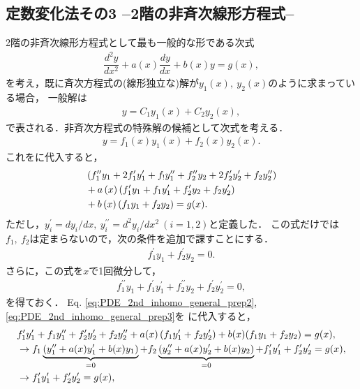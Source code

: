 \subsection{定数変化法その3 –2階の非斉次線形方程式–}
%
2階の非斉次線形方程式として最も一般的な形である次式
\begin{align}
 \dfrac{d^2y}{dx^2} + a(x)\dfrac{dy}{dx} + b(x)y = g(x), \label{eq:PDE_2nd_inhomo_general} 
\end{align}
を考え，既に斉次方程式の(線形独立な)解が$y_1(x),~y_2(x)$のように求まっている場合，
一般解は
\begin{align}
 y = C_1 y_1(x) + C_2 y_2(x), 
\end{align}
で表される．非斉次方程式の特殊解の候補として次式を考える．
\begin{align}
  y = f_1(x) y_1(x) + f_2(x) y_2 (x). 
\end{align}
これをに代入すると，
\begin{align}
   & \left(f_{1}^{\prime\prime}y_{1}+2f_{1}^{\prime}y_{1}^{\prime}+f_{!}y_{1}^{\prime\prime}+f_{2}^{\prime\prime}y_{2}+2f_{2}^{\prime}y_{2}^{\prime}+f_{2}y_{2}^{\prime\prime}\right)\notag\\
 & +a\left(x\right)\left(f_{1}^{\prime}y_{1}+f_{1}y_{1}^{\prime}+f_{2}^{\prime}y_{2}+f_{2}y_{2}^{\prime}\right)\notag\\
 & +b\left(x\right)\left(f_{1}y_{1}+f_{2}y_{2}\right)=g(x). \label{eq:PDE_2nd_inhomo_general_prep1}
\end{align}
ただし，$y^{\prime}_i = dy_i/dx , ~ y^{\prime\prime}_{i} = d^2 y_i/dx^2 ~(i=1,2)$と定義した．
この式だけでは$f_1,~f_2$は定まらないので，次の条件を追加で課すことにする．
\begin{align}
 f_1^\prime y_1 + f_2^\prime y_2 = 0. \label{eq:PDE_2nd_inhomo_general_prep2}
\end{align}
さらに，この式を$x$で1回微分して，
\begin{align}
  f_1^{\prime\prime} y_1 + f_1^{\prime} y_1^{\prime} + f_2^{\prime\prime}y_2 
  + f_2^{\prime} y_2^{\prime} = 0, \label{eq:PDE_2nd_inhomo_general_prep3}
\end{align}
を得ておく．
Eq. \eqref{eq:PDE_2nd_inhomo_general_prep2}, \eqref{eq:PDE_2nd_inhomo_general_prep3}を
に代入すると，
\begin{align}
 &f_1^{\prime} y_1^{\prime} + f_1y_1^{\prime\prime} + f_2^{\prime} y_2^{\prime} + f_2 y_2^{\prime\prime} +a(x)\left(f_1 y_1^{\prime} + f_2 y_2^{\prime}\right) + b(x)(f_1y_1+f_2y_2) = g(x), \notag \\
 &\rightarrow f_1\underbrace{\left(y_1^{\prime\prime} + a(x)y_1^{\prime} + b(x)y_1\right)}_{=0}
  + f_2\underbrace{\left(y_2^{\prime\prime} + a(x)y_2^{\prime} + b(x)y_2\right)}_{=0} 
  + f_1^{\prime}y_1^{\prime}
  + f_2^{\prime} y_2^{\prime} = g(x), \notag \\
 &\rightarrow 
    f_1^{\prime}y_1^{\prime}
  + f_2^{\prime} y_2^{\prime} = g(x), \label{eq:PDE_2nd_inhomo_general_prep4} 
\end{align}
